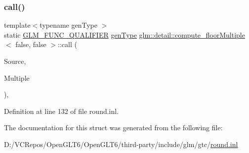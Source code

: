 \subsubsection{\texorpdfstring{call()}{call()}}
{\footnotesize\ttfamily template$<$typename gen\+Type $>$ \\
static \mbox{\hyperlink{setup_8hpp_a33fdea6f91c5f834105f7415e2a64407}{G\+L\+M\+\_\+\+F\+U\+N\+C\+\_\+\+Q\+U\+A\+L\+I\+F\+I\+ER}} \mbox{\hyperlink{structglm_1_1detail_1_1gen_type}{gen\+Type}} \mbox{\hyperlink{structglm_1_1detail_1_1compute__floor_multiple}{glm\+::detail\+::compute\+\_\+floor\+Multiple}}$<$ false, false $>$\+::call (\begin{DoxyParamCaption}\item[{\mbox{\hyperlink{structglm_1_1detail_1_1gen_type}{gen\+Type}}}]{Source,  }\item[{\mbox{\hyperlink{structglm_1_1detail_1_1gen_type}{gen\+Type}}}]{Multiple }\end{DoxyParamCaption})\hspace{0.3cm}{\ttfamily [inline]}, {\ttfamily [static]}}



Definition at line 132 of file round.\+inl.



The documentation for this struct was generated from the following file\+:\begin{DoxyCompactItemize}
\item 
D\+:/\+V\+C\+Repos/\+Open\+G\+L\+T6/\+Open\+G\+L\+T6/third-\/party/include/glm/gtc/\mbox{\hyperlink{round_8inl}{round.\+inl}}\end{DoxyCompactItemize}
